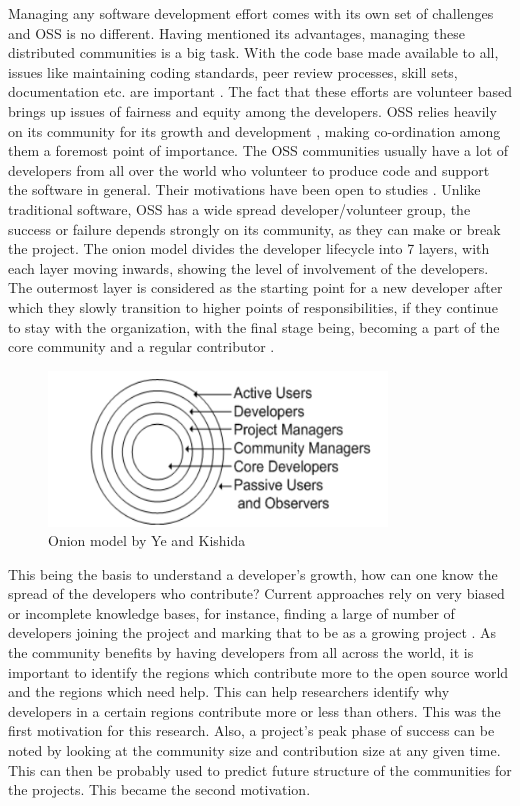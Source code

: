 \documentclass[double,12pt]{beavtex}
\begin{document}
Managing any software development effort comes with its own set of challenges and OSS is no different. Having mentioned its advantages, managing these distributed communities is a big task. With the code base made available to all, issues like maintaining coding standards, peer review processes, skill sets, documentation etc. are important \cite{tum2005}. The fact that these efforts are volunteer based brings up issues of fairness and equity among the developers. OSS relies heavily on its community for its growth and development \cite{seth2010}, making co-ordination among them a foremost point of importance. The OSS communities usually have a lot of developers from all over the world who volunteer to produce code and support the software in general. Their motivations have been open to studies \cite{greg2002}. Unlike traditional software, OSS has a wide spread developer/volunteer group, the success or failure depends strongly on its community, as they can make or break the project. The onion model divides the developer lifecycle into 7 layers, with each layer moving inwards, showing the level of involvement of the developers. The outermost layer is considered as the starting point for a new developer after which they slowly transition to higher points of responsibilities, if they continue to stay with the organization, with the final stage being, becoming a part of the core community and a regular contributor \cite{kishida2003}.

\begin{figure}[H]
\centering
\includegraphics[width=90mm]{onion.png}
\caption{Onion model by Ye and Kishida}
\end{figure}

This being the basis to understand a developer's growth, how can one know the spread of the developers who contribute? Current approaches rely on very biased or incomplete knowledge bases, for instance, finding a large of number of developers joining the project and marking that to be as a growing project \cite{igor2014}. As the community benefits by having developers from all across the world, it is important to identify the regions which contribute more to the open source world and the regions which need help. This can help researchers identify why developers in a certain regions contribute more or less than others. This was the first motivation for this research. Also, a project's peak phase of success can be noted by looking at the community size and contribution size at any given time. This can then be probably used to predict future structure of the communities for the projects. This became the second motivation.
\end{document}
